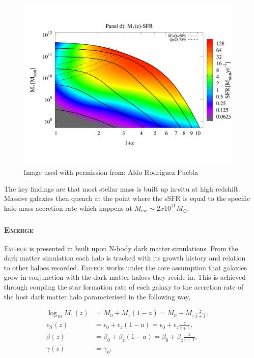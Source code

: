 \begin{figure}[h]
    \centering
    \includegraphics[width = \linewidth]{Figures/Chapter1/RP17_fig9.pdf}
    \caption{Image used with permission from: Aldo Rodriguez Puebla \cite{Rodriguez-Puebla2017ConstrainingProperties}}
    \label{fig:RP_fig}
\end{figure}


The key findings are that most stellar mass is built up in-situ at high redshift. Massive galaxies then quench at the point where the sSFR is equal to the specific halo mass accretion rate which happens at $M_{vir} \sim 2 x 10^{11} M_{\odot}$.


\subsubsection{E\textsc{merge}}
E\textsc{merge} is presented in \citet{Moster2018Emerge10} built upon N-body dark matter simulations. From the dark matter simulation each halo is tracked with its growth history and relation to other haloes recorded. E\textsc{merge} works under the core assumption that galaxies grow in conjunction with the dark matter haloes they reside in. This is achieved through coupling the star formation rate of each galaxy to the accretion rate of the host dark matter halo parameterised in the following way,

\begin{equation}
\begin{aligned} \log _{10} M_{1}(z) &=M_{0}+M_{z}(1-a)=M_{0}+M_{z} \frac{z}{z+1}, \\ \epsilon_{\mathrm{N}}(z) &=\epsilon_{0}+\epsilon_{z}(1-a)=\epsilon_{0}+\epsilon_{z} \frac{z}{z+1}, \\ \beta(z) &=\beta_{0}+\beta_{z}(1-a)=\beta_{0}+\beta_{z} \frac{z}{z+1}, \\ \gamma(z) &=\gamma_{0}, \end{aligned}
\end{equation}

